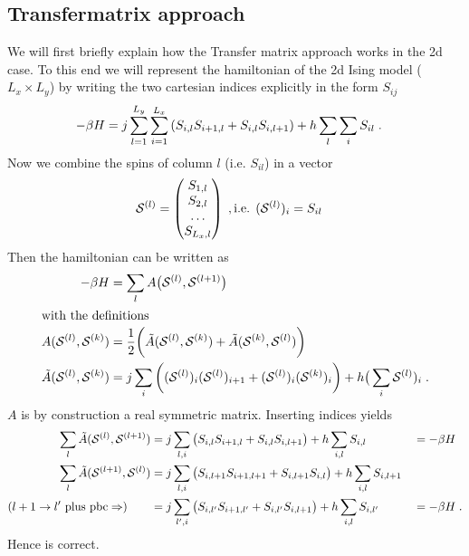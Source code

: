 \subsection{Transfermatrix approach}
We will first briefly explain how the Transfer matrix approach works in the 2d case.
To this end we will represent the hamiltonian of the 2d Ising model ($L_{x}\times L_{y}$)
by writing the two cartesian indices explicitly in the form
$S_{ij}$
%
%
\begin{align*}
-\beta H &= j \sum_{l=1}^{L_{y}} \sum_{i=1}^{L_{x}}	\qty( S_{i,l}S_{i+1,l} +S_{i,l}S_{i,l+1})
+ h \sum_{l} \sum_{i} S_{il}\;.
\end{align*}
%
Now we combine the spins of column $l$  (i.e. $S_{il}$) in a vector
%
\newcommand{\vS}[1]{{ \mathbf {\cal  S}^{(#1)}}}
\newcommand{\vSx}{{ \mathbf {\cal  S}}}
\newcommand{\vSp}{{ \mathbf {\cal  S}'}}
\begin{align*}
\vS{l} &= 
\begin{pmatrix}
S_{1,l}\\
S_{2,l}	\\
\ldots\\
S_{L_{x},l}
\end{pmatrix}\;,
\text{i.e. }(\vS{l})_{i} = S_{il}
\end{align*}
%
Then the hamiltonian can be written as
%
\begin{align}\label{eq:beta:H}
-\beta H &= \sum_{l}  A\big(\vS{l}, \vS{l+1}\big)\\
\intertext{with the definitions}
A(\vS{l},\vS{k}) &= \frac{1}{2}\bigg(\tilde A(\vS{l},\vS{k}) + \tilde A(\vS{k},\vS{l}) \bigg) \\
\tilde A(\vS{l},\vS{k}) &= 
j \sum_{i}  \bigg((\vS{l})_{i} (\vS{l})_{i+1}  +(\vS{l})_{i} (\vS{k})_{i}\bigg)
+ h \big(\sum_{i} \vS{l})_{i}\;.
\end{align}
%
$A$ is by construction a real symmetric matrix.
Inserting indices yields
%
\begin{align*}
\sum_{l} \tilde A(\vS{l},\vS{l+1}) &= 
 j \sum_{l,i}\big(  S_{i,l}S_{i+1,l} +S_{i,l}S_{i,l+1}\big)
+ h \sum_{i,l} S_{i,l} &&= - \beta H\\
\sum_{l} \tilde A(\vS{l+1},\vS{l}) &= 
 j \sum_{l,i}\big(  S_{i,l+1}S_{i+1,l+1} +S_{i,l+1}S_{i,l}\big)
+ h \sum_{i,l} S_{i,l+1} \\
(l+1 \to l'  \text{ plus pbc} \Rightarrow)\qquad 
&= j \sum_{l',i}\big(  S_{i,l'}S_{i+1,l'} +S_{i,l'}S_{i,l+1}\big)
+ h \sum_{i,l} S_{i,l'} &&= - \beta H\;.
\end{align*}
%
Hence  is correct.
